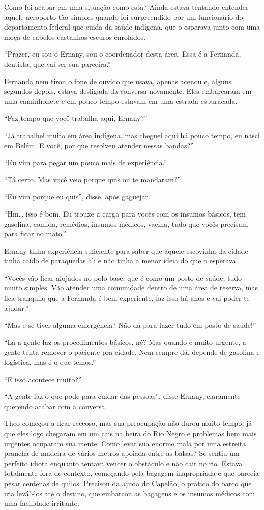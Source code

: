 Como foi acabar em uma situação como esta? Ainda estava tentando
entender aquele aeroporto tão simples quando foi surpreendido por um
funcionário do departamento federal que cuida da saúde indígena, que o
esperava junto com uma moça de cabelos castanhos escuros enrolados.

``Prazer, eu sou o Ernany, sou o coordenador desta área. Essa é a
Fernanda, dentista, que vai ser sua parceira.''

Fernanda nem tirou o fone de ouvido que usava, apenas acenou e, alguns
segundos depois, estava desligada da conversa novamente. Eles embarcaram
em uma caminhonete e em pouco tempo estavam em uma estrada esburacada.

``Faz tempo que você trabalha aqui, Ernany?''

``Já trabalhei muito em área indígena, mas cheguei aqui há pouco tempo,
eu nasci em Belém. E você, por que resolveu atender nessas bandas?''

``Eu vim para pegar um pouco mais de experiência.''

``Tá certo. Mas você veio porque quis ou te mandaram?''

``Eu vim porque eu quis'', disse, após gaguejar.

``Hm\ldots{} isso é bom. Eu trouxe a carga para vocês com os insumos
básicos, tem gasolina, comida, remédios, insumos médicos, vacina, tudo
que vocês precisam para ficar no mato.''

Ernany tinha experiência suficiente para saber que aquele escovinha da
cidade tinha caído de paraquedas ali e não tinha a menor ideia do que o
esperava.

``Vocês vão ficar alojados no polo base, que é como um posto de saúde,
tudo muito simples. Vão atender uma comunidade dentro de uma área de
reserva, mas fica tranquilo que a Fernanda é bem experiente, faz isso há
anos e vai poder te ajudar.''

``Mas e se tiver alguma emergência? Não dá para fazer tudo em posto de
saúde!''

``Lá a gente faz os procedimentos básicos, né? Mas quando é muito
urgente, a gente tenta remover o paciente pra cidade. Nem sempre dá,
depende de gasolina e logística, mas é o que temos.''

``E isso acontece muito?''

``A gente faz o que pode para cuidar das pessoas'', disse Ernany,
claramente querendo acabar com a conversa.

Theo começou a ficar receoso, mas sua preocupação não durou muito tempo,
já que eles logo chegaram em um cais na beira do Rio Negro e
problemas bem mais urgentes ocuparam sua mente. Como levar sua enorme
mala por uma estreita prancha de madeira de vários metros apoiada entre
as balsas? Se sentiu um perfeito idiota enquanto tentava vencer o
obstáculo e não cair no rio. Estava totalmente fora de contexto,
começando pela bagagem inapropriada e que parecia pesar centenas de
quilos. Precisou da ajuda do Capelão, o prático do barco que iria
levá"-los até o destino, que embarcou as bagagens e os insumos médicos
com uma facilidade irritante.

